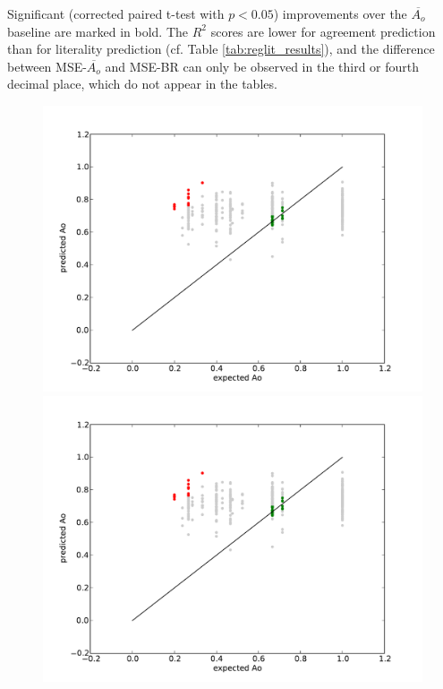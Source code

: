 \documentclass[11pt,a4paper]{article}
\begin{document}
Significant (corrected paired t-test with $p < 0.05$) improvements over the $\overline{A_o}$ baseline are marked in bold. The $R^2$ scores are lower for agreement prediction than for literality prediction (cf. Table \ref{tab:reglit_results}), and the difference between MSE-$\overline{A_o}$ and MSE-BR can only be observed in the third or fourth decimal place, which do not appear in the tables. 


\begin{figure}[htt]
\includegraphics[scale=0.25]{scatterdraft.pdf}\includegraphics[scale=0.25]{scatterdraft.pdf}

\end{figure}
\end{document}
